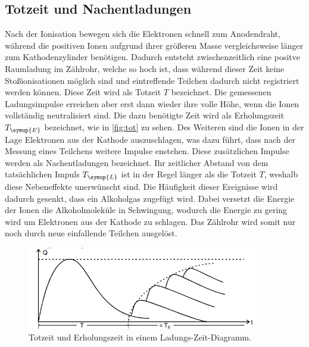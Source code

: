 \subsection{Totzeit und Nachentladungen}
Nach der Ionisation bewegen sich die Elektronen schnell zum Anodendraht, während die positiven Ionen aufgrund ihrer größeren Masse
vergleichsweise länger zum Kathodenzylinder benötigen. Dadurch entsteht zwischenzeitlich eine positve Raumladung im Zählrohr, welche
so hoch ist, dass während dieser Zeit keine Stoßionisationen möglich sind und eintreffende Teilchen dadurch nicht registriert werden können.
Diese Zeit wird als Totzeit $T$ bezeichnet. Die gemessenen Ladungsimpulse erreichen aber erst dann wieder ihre volle Höhe, wenn die Ionen
vollständig neutralisiert sind. Die dazu benötigte Zeit wird als Erholungszeit $T_{\symup{E}}$ bezeichnet, wie in \autoref{fig:tot} zu
sehen. Des Weiteren sind die Ionen in der Lage Elektronen aus der Kathode auszuschlagen, was dazu führt, dass nach der Messung eines Teilchens
weitere Impulse enstehen. Diese zusätzlichen Impulse werden als Nachentladungen bezeichnet. Ihr zeitlicher Abstand von dem tatsächlichen Impuls
$T_{\symup{L}}$ ist in der Regel länger als die Totzeit $T$, weshalb diese Nebeneffekte unerwünscht sind. Die Häufigkeit dieser Ereignisse
wird dadurch gesenkt, dass ein Alkoholgas zugefügt wird. Dabei versetzt die Energie der Ionen die Alkoholmoleküle in
Schwingung, wodurch die Energie zu gering wird um Elektronen aus der Kathode zu schlagen. Das Zählrohr wird somit nur noch durch neue einfallende
Teilchen ausgelöst.
\begin{figure}
    \centering
    \includegraphics[width=0.9\textwidth]{content/totzeit.png}
    \caption{Totzeit und Erholungszeit in einem Ladungs-Zeit-Diagramm.}
    \label{fig:tot}
\end{figure}
